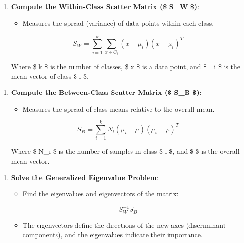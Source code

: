 \documentclass{article}
\providecommand{\tightlist}{%
      \setlength{\itemsep}{0pt}\setlength{\parskip}{0pt}}
\begin{document}
\begin{enumerate}
\def\labelenumi{\arabic{enumi}.}
\setcounter{enumi}{1}
\item
  \textbf{Compute the Within-Class Scatter Matrix (\$ S\_W \$)}:

  \begin{itemize}
  \tightlist
  \item
    Measures the spread (variance) of data points within each class.
  \end{itemize}

  \[
  S_W = \sum_{i=1}^k \sum_{x \in C_i} (x - \mu_i)(x - \mu_i)^T
  \]

  Where \$ k \$ is the number of classes, \$ x \$ is a data point, and
  \$ \mu\_i \$ is the mean vector of class \$ i \$.
\end{enumerate}

\begin{enumerate}
\def\labelenumi{\arabic{enumi}.}
\setcounter{enumi}{2}
\item
  \textbf{Compute the Between-Class Scatter Matrix (\$ S\_B \$)}:

  \begin{itemize}
  \tightlist
  \item
    Measures the spread of class means relative to the overall mean.
  \end{itemize}

  \[
  S_B = \sum_{i=1}^k N_i (\mu_i - \mu)(\mu_i - \mu)^T
  \]

  Where \$ N\_i \$ is the number of samples in class \$ i \$, and \$
  \mu \$ is the overall mean vector.
\end{enumerate}

\begin{enumerate}
\def\labelenumi{\arabic{enumi}.}
\setcounter{enumi}{3}
\item
  \textbf{Solve the Generalized Eigenvalue Problem}:

  \begin{itemize}
  \tightlist
  \item
    Find the eigenvalues and eigenvectors of the matrix:
  \end{itemize}

  \[
    S_W^{-1} S_B
    \]

  \begin{itemize}
  \tightlist
  \item
    The eigenvectors define the directions of the new axes (discriminant
    components), and the eigenvalues indicate their importance.
  \end{itemize}
\end{enumerate}
\end{document}
